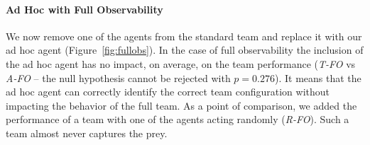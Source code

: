
\paragraph{Ad Hoc with Full Observability}

We now remove one of the agents from the standard team and replace it with our ad hoc agent (Figure~\ref{fig:fullobs}). In the case of full observability the inclusion of the ad hoc agent has no impact, on average, on the team performance (\emph{T-FO} vs \emph{A-FO} -- the null hypothesis cannot be rejected with {\small$p=0.276$}). It means that the ad hoc agent can correctly identify the correct team configuration without impacting the behavior of the full team. As a point of comparison, we added the performance of a team with one of the agents acting randomly (\emph{R-FO}). Such a team almost never captures the prey.


